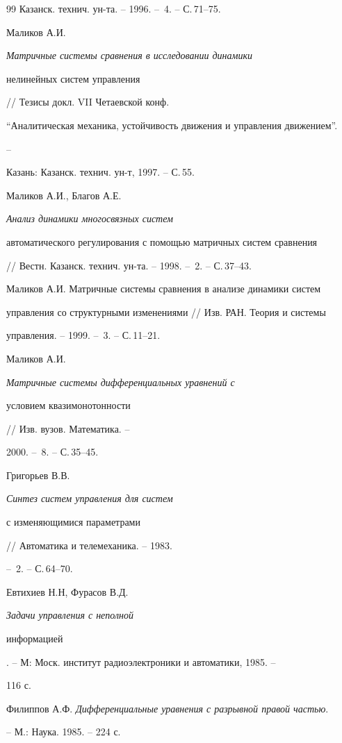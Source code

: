 \begin{thebibliography}{99}
Казанск. технич. ун-та. -- 1996. -- \No\,4. -- С.\,71--75. 




Маликов А.И. {\em Матричные системы сравнения в исследовании динамики 


нелинейных систем управления} // Тезисы докл. VII Четаевской конф. 


``Аналитическая механика, устойчивость движения и управления движением''. 


-- 


Казань: Казанск. технич. ун-т, 1997. -- С.\,55. 




Маликов А.И., Благов А.Е. {\em Анализ динамики многосвязных систем 


автоматического регулирования с помощью матричных систем сравнения} 


// Вестн. Казанск. технич. ун-та. -- 1998. -- \No\,2. -- С.\,37--43. 




Маликов А.И. Матричные системы сравнения в анализе динамики систем 


управления со структурными изменениями // Изв. РАН. Теория и системы 


управления. -- 1999. -- \No\,3. -- С.\,11--21. 




Маликов А.И. {\em Матричные системы дифференциальных уравнений с 


условием квазимонотонности} // Изв. вузов. Математика. -- 


2000. -- \No\,8. -- С.\,35--45. 




Григорьев В.В. {\em Синтез систем управления для систем 


с изменяющимися параметрами} // Автоматика и телемеханика. -- 1983. 


-- \No\,2. -- С.\,64--70. 




Евтихиев Н.Н, Фурасов В.Д. {\em Задачи управления с неполной 


информацией}. -- М: Моск. институт радиоэлектроники и автоматики, 1985. -- 


116 с. 




Филиппов А.Ф. {\em Дифференциальные уравнения с разрывной правой частью}. 


-- М.: Наука. 1985. -- 224 с. 



\end{thebibliography}
